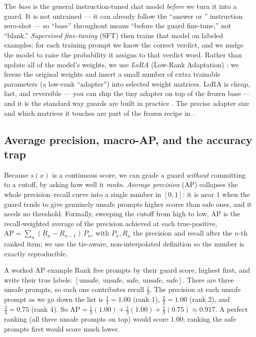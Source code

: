 The \emph{base} is the general instruction-tuned chat model \emph{before} we turn it into a guard. It
is not untrained --- it can already follow the ``answer  or '' instruction
zero-shot --- so ``base'' throughout means ``before the guard fine-tune,'' not ``blank.''
\emph{Supervised fine-tuning} (SFT) then trains that model on labeled examples: for each training
prompt we know the correct verdict, and we nudge the model to raise the probability it assigns to that
verdict word. Rather than update all of the model's weights, we use \emph{LoRA} (Low-Rank Adaptation)
\citep{hu2021lora}: we freeze the original weights and insert a small number of extra trainable
parameters (a low-rank ``adapter'') into selected weight matrices. LoRA is cheap, fast, and reversible
--- you can ship the tiny adapter on top of the frozen base --- and it is the standard way guards are
built in practice \citep{elesedy2024loraguard}. The precise adapter size and which matrices it touches
are part of the frozen recipe in .

\subsection{Average precision, macro-AP, and the accuracy trap}
\label{sec:bg-ap}

Because $s(x)$ is a continuous score, we can grade a guard \emph{without} committing to a cutoff, by
asking how well it \emph{ranks}. \emph{Average precision} (AP) collapses the whole
precision--recall curve into a single number in $[0,1]$: it is near $1$ when the guard tends to give
genuinely unsafe prompts higher scores than safe ones, and it needs no threshold. Formally, sweeping
the cutoff from high to low, AP is the recall-weighted average of the precision achieved at each
true-positive, $\text{AP}=\sum_n (R_n-R_{n-1})\,P_n$, with $P_n,R_n$ the precision and recall after the
$n$-th ranked item; we use the tie-aware, non-interpolated  definition so the number
is exactly reproducible.

\begin{background}{A worked AP example}
Rank five prompts by their guard score, highest first, and write their true labels:
$[\text{unsafe},\ \text{unsafe},\ \text{safe},\ \text{unsafe},\ \text{safe}]$. There are three unsafe
prompts, so each one contributes recall $\tfrac13$. The precision at each unsafe prompt as we go down
the list is $\tfrac11{=}1.00$ (rank 1), $\tfrac22{=}1.00$ (rank 2), and $\tfrac34{=}0.75$ (rank 4). So
$\text{AP}=\tfrac13(1.00)+\tfrac13(1.00)+\tfrac13(0.75)\approx 0.917$. A perfect ranking (all three
unsafe prompts on top) would score $1.00$; ranking the safe prompts first would score much lower.
\end{background}

